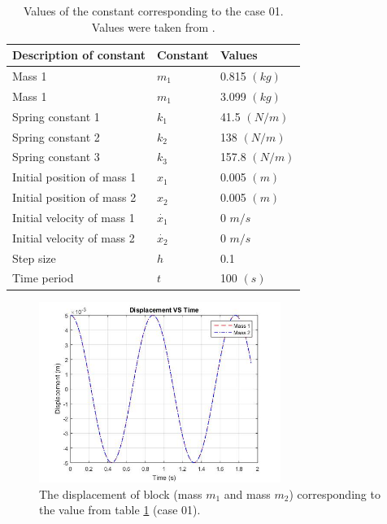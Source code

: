  \begin{table}[hbt!]
\begin{center}
    \begin{tabular}{p{6cm}|p{2cm}|p{3cm}}
    \hline
    \textbf{Description of constant} & \textbf{Constant} & \textbf{Values}
    \\
    \hline \hline
    Mass 1 & $m_1$ & 0.815 $(kg)$\\
    Mass 1 & $m_1$ & 3.099 $(kg)$\\
      Spring constant 1  & $k_1$ & 41.5 $(N/m)$\\
      Spring constant 2  & $k_2$  &138 $(N/m)$\\
    Spring constant 3  & $k_3$ & 157.8 $(N/m)$\\
     Initial position of mass 1 & $x_1$ & 0.005 $(m)$ \\
     Initial position of mass 2 & $x_2$ & 0.005 $(m)$  \\
     Initial velocity of mass 1 & $\dot{x_1}$ & 0 $m/s$ \\
     Initial velocity of mass 2 & $\dot{x_2}$ & 0 $m/s$  \\
     Step size & $h$ & 0.1  \\
     Time period & $t$ & 100 $(s)$ \\
     \hline
    \end{tabular}
    \caption{Values of the constant corresponding to the case 01. Values were taken from \cite{JETIRRes28:online}. }
    \label{tabR1}
    \end{center}
\end{table}
  

 \begin{figure}[hbt!]
	\centering
	\begin{framed}
	\includegraphics[width=0.7\textwidth]{Figures/R1D.jpg}
		\end{framed}
	\caption{ The displacement of block (mass $m_1$ and mass $m_2$) corresponding to the value from table \ref{tabR1} (case 01).}
	\label{fig:R1}
\end{figure}
 
